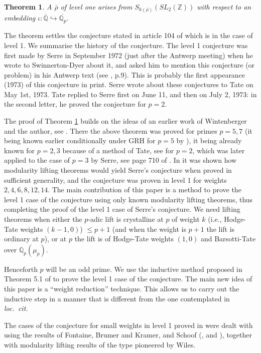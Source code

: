 \documentclass[12pt]{amsart}
\newcommand{\Q}{\mathbb{Q}}
\newcommand{\aQ}{\overline{\mathbb{Q}}}
\newcommand{\Z}{\mathbb{Z}}
\newcommand{\aQp}{\overline{\mathbb{Q}_{p}}}
\newtheorem{theorem}{Theorem}[section]
\def\rhob{ {\bar {\rho} } }
\begin{document}
\begin{theorem}\label{main}
  A $\rhob$ of level one arises from $S_{k(\rhob)}(SL_2(\Z))$ with respect
  to an embedding $\iota:\aQ \hookrightarrow \aQp$.
\end{theorem}

The theorem settles the conjecture stated 
in article 104 of \cite{Serre2} which is in the case of level 1.
We summarise the history of the conjecture. The level 1  
conjecture was first 
made by Serre in September 1972 (just after the Antwerp meeting)  when he
wrote to Swinnerton-Dyer about it, and asked him to mention this
conjecture (or problem) in his Antwerp text (see \cite{SWD}, p.9). This is
probably the first appearance (1973) of this conjecture in print.
Serre wrote about these conjectures to Tate on May 1st, 1973.
Tate replied to Serre first on June 11, and then on July 2, 1973: in the second letter, he 
proved the conjecture for $p = 2$.


The proof of Theorem \ref{main} builds on the ideas of an earlier work of
Wintenberger and the author, see \cite{KW}. There the above
theorem was proved for primes $p=5,7$ (it being known 
earlier conditionally under GRH for $p=5$ by \cite{Brue}), it being already known
for $p=2,3$ because of a method of Tate, see \cite{Tate} for $p=2$, which was 
later applied to the case of $p=3$ by Serre, see page 710 of
\cite{Serre2}. In \cite{KW} it was shown how
modularity lifting theorems would yield Serre's conjecture when proved in
sufficient generality, and the conjecture was proven in level 1 for
weights $2,4,6,8,12,14$.
The main contribution of this paper is a method to 
prove the level 1 case of the
conjecture using only known modularity lifting theorems, thus completing the proof of the level 1 case of Serre's conjecture. We need lifting theorems when either the $p$-adic lift is crystalline at $p$ of weight $k$ (i.e., Hodge-Tate weights $(k-1,0)$) $\leq p+1$ (and when the weight is $p+1$ the lift is ordinary at $p$), or at $p$ the lift is of Hodge-Tate weights $(1,0)$ and 
Barsotti-Tate over $\Q_p(\mu_p)$. 


Henceforth $p$ will be an odd prime.
We use the inductive method proposed in Theorem 5.1 of \cite{KW}
to prove the level 1 case of the conjecture. 
The main new idea of this paper is a ``weight reduction'' 
technique. This  allows us to carry out 
the inductive step in a manner that is different from the one contemplated in 
{\it loc.\ cit.\ }

The cases of the conjecture for small weights in level 1 proved in \cite{KW}
were dealt with using the
results of Fontaine, Brumer and Kramer, and Schoof (\cite{Fontaine}, \cite{BK} and \cite{Schoof1}), together with modularity
lifting results of the type pioneered by Wiles.  
\end{document}
